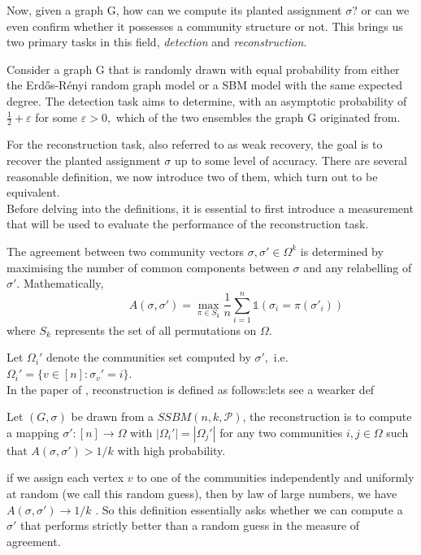 Now, given a graph G, how can we compute its planted assignment $\sigma$? or  can we even confirm whether it possesses a community structure or not. This brings us two primary tasks in this field, \textit{detection} and \textit{reconstruction}.
\begin{definition}[Detection]
    Consider a graph G that is randomly drawn with equal probability from either the Erd\H{o}s-R\'{e}nyi random graph model or a SBM model with the same expected degree. The detection task aims to determine, with an asymptotic probability of $\frac{1}{2}+\varepsilon$ for some $\varepsilon > 0,$ which of the two ensembles the graph G originated from.
\end{definition}
For the reconstruction task, also referred to as weak recovery, the goal is to recover the planted assignment $\sigma$ up to some level of accuracy. There are several reasonable definition, we now introduce two of them, which turn out to be equivalent.\\
Before delving into the definitions, it is essential to first introduce a measurement that will be used to evaluate the performance of the reconstruction task.
\begin{definition}[Agreement]
The agreement between two community vectors $\sigma, \sigma'\in\Omega^k$ is determined by maximising the number of common components between $\sigma$ and any relabelling of $\sigma'.$ Mathematically, \begin{equation}
    ~~~~~~~~~~~~~~~~~~~~A(\sigma, \sigma')=\max_{\pi \in S_k} \frac{1}{n} \sum_{i=1}^{n} \mathbb{1}(\sigma_i = \pi(\sigma'_i))
\end{equation}
where $S_k$ represents the set of all permutations on $\Omega$.
\end{definition}
Let $\Omega_i'$ denote the communities set computed by $\sigma',$ i.e. $\Omega_i'=\{v\in[n]: \sigma_v'=i\}.$\\
In the paper of \cite{TheSurvey} \cite{firstpaper}, reconstruction is defined as follows:\textcolor{Mahogany}{lets see a wearker def}
\begin{definition}[Reconstruction]\label{def: recover_1}
Let $(G, \sigma)$ be drawn from a $SSBM(n, k, \mathcal{P})$, the reconstruction is to compute a mapping $\sigma': [n]\rightarrow \Omega$ with $|\Omega_i'|=|\Omega_j'|$ for any two communities $i, j\in\Omega$   such that $A(\sigma, \sigma')> 1/k$ \textcolor{Mahogany}{with high probability.}
\end{definition}
\begin{remark}
    if we assign each vertex $v$ to one of the communities independently and uniformly at random (we call this random guess), then by law of large numbers, we have $A(\sigma, \sigma')\rightarrow 1/k$ \cite{TheSurvey}. So this definition essentially asks whether we can compute a $\sigma'$ that performs strictly better than a random guess in the measure of agreement.
\end{remark}
